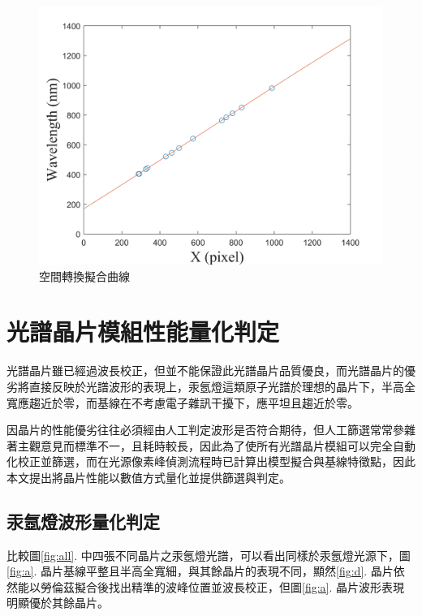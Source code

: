 \begin{figure}[H] %
	\centering %
	\includegraphics[width=16cm]{figures/COMBINE擬合結果.png} %
	\caption{空間轉換擬合曲線} %
	\label{空間轉換擬和曲線} %
\end{figure}

\section{光譜晶片模組性能量化判定}
光譜晶片雖已經過波長校正，但並不能保證此光譜晶片品質優良，而光譜晶片的優劣將直接反映於光譜波形的表現上，汞氬燈這類原子光譜於理想的晶片下，半高全寬應趨近於零，而基線在不考慮電子雜訊干擾下，應平坦且趨近於零。\par
因晶片的性能優劣往往必須經由人工判定波形是否符合期待，但人工篩選常常參雜著主觀意見而標準不一，且耗時較長，因此為了使所有光譜晶片模組可以完全自動化校正並篩選，而在光源像素峰偵測流程時已計算出模型擬合與基線特徵點，因此本文提出將晶片性能以數值方式量化並提供篩選與判定。

\subsection{汞氬燈波形量化判定}
比較圖\ref{fig:all}. 中四張不同晶片之汞氬燈光譜，可以看出同樣於汞氬燈光源下，圖\ref{fig:a}. 晶片基線平整且半高全寬細，與其餘晶片的表現不同，顯然\ref{fig:d}. 晶片依然能以勞倫茲擬合後找出精準的波峰位置並波長校正，但圖\ref{fig:a}. 晶片波形表現明顯優於其餘晶片。

